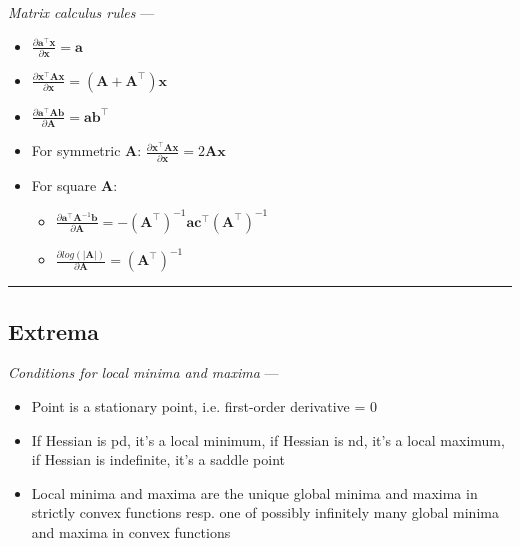 \emph{Matrix calculus rules} --- 
\begin{multicols}{2}
\begin{itemize}
    \item $\frac{\partial \boldsymbol{a}^\intercal\boldsymbol{x}}{\partial \boldsymbol{x}} = \boldsymbol{a}$
    \item $\frac{\partial \boldsymbol{x}^\intercal\boldsymbol{A}\boldsymbol{x}}{\partial \boldsymbol{x}} = (\boldsymbol{A} + \boldsymbol{A}^\intercal)\boldsymbol{x}$
    \item $\frac{\partial \boldsymbol{a}^\intercal\boldsymbol{A}\boldsymbol{b}}{\partial \boldsymbol{A}} = \boldsymbol{a}\boldsymbol{b}^\intercal$
    \item For symmetric $\boldsymbol{A}$: $\frac{\partial \boldsymbol{x}^\intercal\boldsymbol{A}\boldsymbol{x}}{\partial \boldsymbol{x}} = 2\boldsymbol{A}\boldsymbol{x}$
    \item For square $\boldsymbol{A}$: 
    \begin{itemize}
        \item $\frac{\partial \boldsymbol{a}^\intercal\boldsymbol{A}^{-1}\boldsymbol{b}}{\partial \boldsymbol{A}} = -(\boldsymbol{A}^\intercal)^{-1} \boldsymbol{a}\boldsymbol{c}^\intercal (\boldsymbol{A}^\intercal)^{-1}$
        \item $\frac{\partial log(|\boldsymbol{A}|)}{\partial \boldsymbol{A}} = (\boldsymbol{A}^\intercal)^{-1}$
    \end{itemize}
\end{itemize}
\end{multicols}

{\color{black}\hrule height 0.001mm}

\subsection*{Extrema}
\emph{Conditions for local minima and maxima} --- 
\begin{itemize}
    \item Point is a stationary point, i.e. first-order derivative = 0
    \item If Hessian is pd, it's a local minimum, if Hessian is nd, it's a local maximum, if Hessian is indefinite, it's a saddle point
    \item Local minima and maxima are the unique global minima and maxima in strictly convex functions resp. one of possibly infinitely many global minima and maxima in convex functions
\end{itemize}

